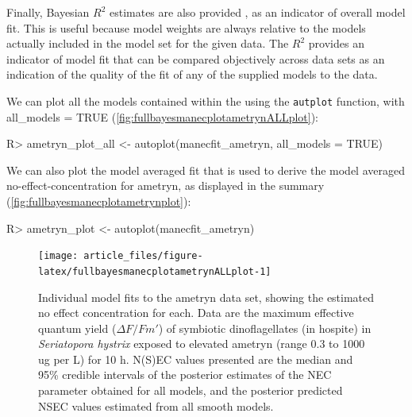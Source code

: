\documentclass[
  shortnames]{jss}
\begin{document}
Finally, Bayesian \(R^2\) estimates are also provided \citep{gelman2019}, as an indicator of overall model fit. This is useful because model weights are always relative to the models actually included in the model set for the given data. The \(R^2\) provides an indicator of model fit that can be compared objectively across data sets as an indication of the quality of the fit of any of the supplied models to the data.

We can plot all the models contained within the  using the \texttt{autplot} function, with all\_models = TRUE (\autoref{fig:fullbayesmanecplotametrynALLplot}):

\begin{CodeChunk}
\begin{CodeInput}
R> ametryn_plot_all <- autoplot(manecfit_ametryn, all_models = TRUE)
\end{CodeInput}
\end{CodeChunk}

We can also plot the model averaged fit that is used to derive the model averaged no-effect-concentration for ametryn, as displayed in the summary (\autoref{fig:fullbayesmanecplotametrynplot}):

\begin{CodeChunk}
\begin{CodeInput}
R> ametryn_plot <- autoplot(manecfit_ametryn)
\end{CodeInput}
\end{CodeChunk}

\begin{CodeChunk}
\begin{figure}[!ht]

{\centering \texttt{[image: article\_files/figure-latex/fullbayesmanecplotametrynALLplot-1]} 

}

\caption{Individual model fits to the ametryn data set, showing the estimated no effect concentration for each. Data are the maximum effective quantum yield ($\Delta F / Fm'$) of symbiotic dinoflagellates (in hospite) in \textit{Seriatopora hystrix} exposed to elevated ametryn (range 0.3 to 1000 ug per L) for 10 h. N(S)EC values presented are the median and 95\% credible intervals of the posterior estimates of the NEC parameter obtained for all  models, and the posterior predicted NSEC values estimated from all smooth  models.}\label{fig:fullbayesmanecplotametrynALLplot}
\end{figure}
\end{CodeChunk}
\end{document}
